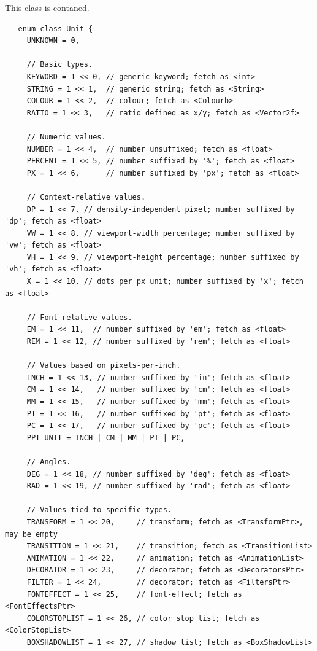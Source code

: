 \documentclass{article}
\begin{document}
This class is contaned.





  \begin{verbatim}
   enum class Unit {
     UNKNOWN = 0,

     // Basic types.
     KEYWORD = 1 << 0, // generic keyword; fetch as <int>
     STRING = 1 << 1,  // generic string; fetch as <String>
     COLOUR = 1 << 2,  // colour; fetch as <Colourb>
     RATIO = 1 << 3,   // ratio defined as x/y; fetch as <Vector2f>

     // Numeric values.
     NUMBER = 1 << 4,  // number unsuffixed; fetch as <float>
     PERCENT = 1 << 5, // number suffixed by '%'; fetch as <float>
     PX = 1 << 6,      // number suffixed by 'px'; fetch as <float>

     // Context-relative values.
     DP = 1 << 7, // density-independent pixel; number suffixed by 'dp'; fetch as <float>
     VW = 1 << 8, // viewport-width percentage; number suffixed by 'vw'; fetch as <float>
     VH = 1 << 9, // viewport-height percentage; number suffixed by 'vh'; fetch as <float>
     X = 1 << 10, // dots per px unit; number suffixed by 'x'; fetch as <float>

     // Font-relative values.
     EM = 1 << 11,  // number suffixed by 'em'; fetch as <float>
     REM = 1 << 12, // number suffixed by 'rem'; fetch as <float>

     // Values based on pixels-per-inch.
     INCH = 1 << 13, // number suffixed by 'in'; fetch as <float>
     CM = 1 << 14,   // number suffixed by 'cm'; fetch as <float>
     MM = 1 << 15,   // number suffixed by 'mm'; fetch as <float>
     PT = 1 << 16,   // number suffixed by 'pt'; fetch as <float>
     PC = 1 << 17,   // number suffixed by 'pc'; fetch as <float>
     PPI_UNIT = INCH | CM | MM | PT | PC,

     // Angles.
     DEG = 1 << 18, // number suffixed by 'deg'; fetch as <float>
     RAD = 1 << 19, // number suffixed by 'rad'; fetch as <float>

     // Values tied to specific types.
     TRANSFORM = 1 << 20,     // transform; fetch as <TransformPtr>, may be empty
     TRANSITION = 1 << 21,    // transition; fetch as <TransitionList>
     ANIMATION = 1 << 22,     // animation; fetch as <AnimationList>
     DECORATOR = 1 << 23,     // decorator; fetch as <DecoratorsPtr>
     FILTER = 1 << 24,        // decorator; fetch as <FiltersPtr>
     FONTEFFECT = 1 << 25,    // font-effect; fetch as <FontEffectsPtr>
     COLORSTOPLIST = 1 << 26, // color stop list; fetch as <ColorStopList>
     BOXSHADOWLIST = 1 << 27, // shadow list; fetch as <BoxShadowList>


\end{verbatim}
\end{document}
